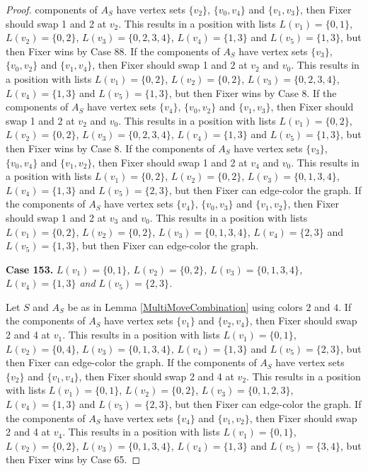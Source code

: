 \documentclass[12pt]{amsart}
\theoremstyle{plain}
\theoremstyle{definition}
\theoremstyle{remark}
\begin{document}
\begin{proof}
components of $A_S$ have vertex sets $\{v_2\}$, $\{v_0, v_4\}$ and $\{v_1, v_3\}$, then Fixer should swap 1 and 2 at $v_2$. This results in a position with lists $L(v_1) = \{0, 1\}$, $L(v_2) = \{0, 2\}$, $L(v_3) = \{0, 2, 3, 4\}$, $L(v_4) = \{1, 3\}$ and $L(v_5) = \{1, 3\}$, but then Fixer wins by Case 88. If the components of $A_S$ have vertex sets $\{v_3\}$, $\{v_0, v_2\}$ and $\{v_1, v_4\}$, then Fixer should swap 1 and 2 at $v_2$ and $v_0$. This results in a position with lists $L(v_1) = \{0, 2\}$, $L(v_2) = \{0, 2\}$, $L(v_3) = \{0, 2, 3, 4\}$, $L(v_4) = \{1, 3\}$ and $L(v_5) = \{1, 3\}$, but then Fixer wins by Case 8. If the components of $A_S$ have vertex sets $\{v_4\}$, $\{v_0, v_2\}$ and $\{v_1, v_3\}$, then Fixer should swap 1 and 2 at $v_2$ and $v_0$. This results in a position with lists $L(v_1) = \{0, 2\}$, $L(v_2) = \{0, 2\}$, $L(v_3) = \{0, 2, 3, 4\}$, $L(v_4) = \{1, 3\}$ and $L(v_5) = \{1, 3\}$, but then Fixer wins by Case 8. If the components of $A_S$ have vertex sets $\{v_3\}$, $\{v_0, v_4\}$ and $\{v_1, v_2\}$, then Fixer should swap 1 and 2 at $v_4$ and $v_0$. This results in a position with lists $L(v_1) = \{0, 2\}$, $L(v_2) = \{0, 2\}$, $L(v_3) = \{0, 1, 3, 4\}$, $L(v_4) = \{1, 3\}$ and $L(v_5) = \{2, 3\}$, but then Fixer can edge-color the graph. If the components of $A_S$ have vertex sets $\{v_4\}$, $\{v_0, v_3\}$ and $\{v_1, v_2\}$, then Fixer should swap 1 and 2 at $v_3$ and $v_0$. This results in a position with lists $L(v_1) = \{0, 2\}$, $L(v_2) = \{0, 2\}$, $L(v_3) = \{0, 1, 3, 4\}$, $L(v_4) = \{2, 3\}$ and $L(v_5) = \{1, 3\}$, but then Fixer can edge-color the graph. 

\noindent\textbf{Case 153.  }\textit{$L(v_1) = \{0, 1\}$, $L(v_2) = \{0, 2\}$, $L(v_3) = \{0, 1, 3, 4\}$, $L(v_4) = \{1, 3\}$ and $L(v_5) = \{2, 3\}$.}

Let $S$ and $A_S$ be as in Lemma \ref{MultiMoveCombination} using colors $2$ and $4$. If the components of $A_S$ have vertex sets $\{v_1\}$ and $\{v_2, v_4\}$, then Fixer should swap 2 and 4 at $v_1$. This results in a position with lists $L(v_1) = \{0, 1\}$, $L(v_2) = \{0, 4\}$, $L(v_3) = \{0, 1, 3, 4\}$, $L(v_4) = \{1, 3\}$ and $L(v_5) = \{2, 3\}$, but then Fixer can edge-color the graph. If the components of $A_S$ have vertex sets $\{v_2\}$ and $\{v_1, v_4\}$, then Fixer should swap 2 and 4 at $v_2$. This results in a position with lists $L(v_1) = \{0, 1\}$, $L(v_2) = \{0, 2\}$, $L(v_3) = \{0, 1, 2, 3\}$, $L(v_4) = \{1, 3\}$ and $L(v_5) = \{2, 3\}$, but then Fixer can edge-color the graph. If the components of $A_S$ have vertex sets $\{v_4\}$ and $\{v_1, v_2\}$, then Fixer should swap 2 and 4 at $v_4$. This results in a position with lists $L(v_1) = \{0, 1\}$, $L(v_2) = \{0, 2\}$, $L(v_3) = \{0, 1, 3, 4\}$, $L(v_4) = \{1, 3\}$ and $L(v_5) = \{3, 4\}$, but then Fixer wins by Case 65. 


\end{proof}
\end{document}
